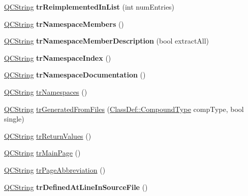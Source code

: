 \begin{DoxyCompactItemize}
\mbox{\hyperlink{class_q_c_string}{Q\+C\+String}} {\bfseries tr\+Reimplemented\+In\+List} (int num\+Entries)
\item 
\mbox{\label{class_translator_croatian_ab913f18c8d015f8a57c6296b99a2e26b}} 
\mbox{\hyperlink{class_q_c_string}{Q\+C\+String}} {\bfseries tr\+Namespace\+Members} ()
\item 
\mbox{\label{class_translator_croatian_a8b2c5a41ee31f62d1a479a6cdadc853e}} 
\mbox{\hyperlink{class_q_c_string}{Q\+C\+String}} {\bfseries tr\+Namespace\+Member\+Description} (bool extract\+All)
\item 
\mbox{\label{class_translator_croatian_a0f1ce235cd238e9db111d369e7d9265a}} 
\mbox{\hyperlink{class_q_c_string}{Q\+C\+String}} {\bfseries tr\+Namespace\+Index} ()
\item 
\mbox{\label{class_translator_croatian_a909ee414c2739b54ce43328f8687c6af}} 
\mbox{\hyperlink{class_q_c_string}{Q\+C\+String}} {\bfseries tr\+Namespace\+Documentation} ()
\item 
\mbox{\hyperlink{class_q_c_string}{Q\+C\+String}} \mbox{\hyperlink{class_translator_croatian_adc337ec4e3e306ad6159ac42c56ee436}{tr\+Namespaces}} ()
\item 
\mbox{\hyperlink{class_q_c_string}{Q\+C\+String}} \mbox{\hyperlink{class_translator_croatian_aabb6a30ea2fe31507b1c55593e206681}{tr\+Generated\+From\+Files}} (\mbox{\hyperlink{class_class_def_ae70cf86d35fe954a94c566fbcfc87939}{Class\+Def\+::\+Compound\+Type}} comp\+Type, bool single)
\item 
\mbox{\hyperlink{class_q_c_string}{Q\+C\+String}} \mbox{\hyperlink{class_translator_croatian_a37df799d71af45d282b0cb51f192eff7}{tr\+Return\+Values}} ()
\item 
\mbox{\hyperlink{class_q_c_string}{Q\+C\+String}} \mbox{\hyperlink{class_translator_croatian_a3b36b638e21764633745594e5677d4e6}{tr\+Main\+Page}} ()
\item 
\mbox{\hyperlink{class_q_c_string}{Q\+C\+String}} \mbox{\hyperlink{class_translator_croatian_aba7b83dec5ef1b4b4f2286bfe543158a}{tr\+Page\+Abbreviation}} ()
\item 
\mbox{\label{class_translator_croatian_aeb559bb2330704a787148cae40014ada}} 
\mbox{\hyperlink{class_q_c_string}{Q\+C\+String}} {\bfseries tr\+Defined\+At\+Line\+In\+Source\+File} ()

\end{DoxyCompactItemize}
